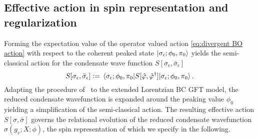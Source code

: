 \documentclass[11pt,a4paper]{article}
\newcommand{\defeq}{\vcentcolon=}
\begin{document}
\subsection{Effective action in spin representation and regularization}\label{subsec:Spin Representation of the Action and Regularization}

Forming the expectation value of the operator valued action \eqref{eq:divergent BO action} with respect to the coherent peaked state $\ket{\sigma_{\epsilon};\phi_0,\pi_0}$ yields the semi-classical action for the condensate wave function $S[\sigma_{\epsilon},\bar{\sigma}_{\epsilon}]$
%
\begin{equation}
S[\sigma_{\epsilon},\bar{\sigma}_{\epsilon}] \defeq \expval{S[\hat{\varphi},\hat{\varphi}^{\dagger}]}{\sigma_{\epsilon};\phi_0,\pi_0}.
\end{equation}
%
Adapting the procedure of~\cite{Marchetti:2020umh} to the extended Lorentzian BC GFT model, the reduced condensate wavefunction is expanded around the peaking value $\phi_0$ yielding a simplification of the semi-classical action. The resulting effective action $S[\sigma,\bar{\sigma}]$ governs the relational evolution of the reduced condensate wavefunction $\sigma(g_v;X;\phi)$, the spin representation of which we specify in the following.
\end{document}
